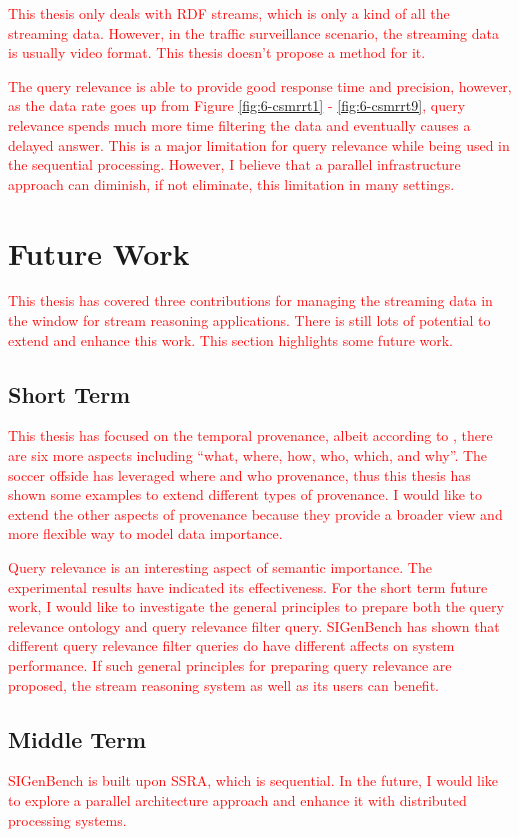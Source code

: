 \textcolor{red}{
This thesis only deals with RDF streams, which is only a kind of all the streaming data.
However, in the traffic surveillance scenario, the streaming data is usually video format. 
This thesis doesn't propose a method for it. 
}

\textcolor{red}{
The query relevance is able to provide good response time and precision, however, as the data rate goes up from Figure \ref{fig:6-csmrrt1} - \ref{fig:6-csmrrt9}, query relevance spends much more time filtering the data and eventually causes a delayed answer. 
This is a major limitation for query relevance while being used in the sequential processing. 
However, I believe that a parallel infrastructure approach can diminish, if not eliminate, this limitation in many settings.
}
%
\section{Future Work}
\textcolor{red}{
This thesis has covered three contributions for managing the streaming data in the window for stream reasoning applications.
There 
is still lots of potential to extend and enhance this work. 
This section highlights some future work.
}
%
\subsection{Short Term}
\textcolor{red}{
This thesis has focused on the temporal provenance, albeit according to \cite{ram2009new}, there are six more aspects including ``what, where, how, who, which, and why''.
The soccer offside has leveraged where and who provenance, thus this thesis has shown some examples to extend different types of provenance.
I would like to extend the other aspects of provenance because they provide a broader view and more flexible way to model data importance.
}

\textcolor{red}{
Query relevance is an interesting aspect of semantic importance.
The experimental results have indicated its effectiveness. 
For the short term future work, I would like to investigate the general principles to prepare both the query relevance ontology and query relevance filter query. 
SIGenBench has shown that different query relevance filter queries do have different affects on system performance. 
If such general principles for preparing query relevance are proposed, the stream reasoning system as well as its users can benefit.
}
%
\subsection{Middle Term}
\textcolor{red}{
SIGenBench is built upon SSRA, which is sequential.
In the future, I would like to explore a parallel architecture approach and enhance it with distributed processing systems.
}

